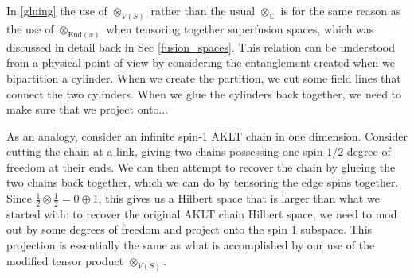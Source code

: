 \documentclass[12pt,a4paper]{article}
\newcounter{arrow}
\newcommand{\tp}{\otimes}
\newcommand{\ra}{\rightarrow}
\newcommand{\cc}{\mathbb{C}}
\newcommand{\zt}{\mathbb{Z}_2}
\newcommand\be            {\begin{equation}}
\newcommand\ee            {\end{equation}}
\newcommand{\End}{\text{End}}
\newcommand{\fld}{\mathcal{F}} %
\begin{document}
In \eqref{gluing} the use of $\tp_{V(S)}$ rather than the usual $\tp_\cc$ is for the same reason as the use of $\tp_{\End(x)}$ when tensoring together superfusion spaces, which was discussed in detail back in Sec \ref{fusion_spaces}. This relation can be understood from a physical point of view by considering the entanglement created when we bipartition a cylinder. When we create the partition, we cut some field lines that connect the two cylinders. When we glue the cylinders back together, we need to make sure that we project onto...

As an analogy, consider an infinite spin-1 AKLT chain in one dimension. Consider cutting the chain at a link, giving two chains possessing one spin-$1/2$ degree of freedom at their ends. We can then attempt to recover the chain by glueing the two chains back together, which we can do by tensoring the edge spins together. Since $\frac{1}{2}\tp \frac{1}{2} = 0\oplus 1$, this gives us a Hilbert space that is larger than what we started with: to recover the original AKLT chain Hilbert space, we need to mod out by some degrees of freedom and project onto the spin $1$ subspace. This projection is essentially the same as what is accomplished by our use of the modified tensor product $\tp_{V(S)}$. 


\end{document}
